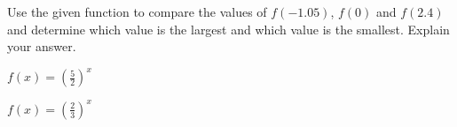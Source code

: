 \vfill

\begin{exercise}Use the given function to compare the values of $f(-1.05)$, $f(0)$ and $f(2.4)$ and determine which value is the largest and which value is the smallest. Explain your answer. \\
	\noindent
	\begin{enumerate*}[label={(\arabic*)~}]
		\item $f(x)=\left(\frac{5}{2}\right)^x$
		\item $f(x)=\left(\frac23\right)^x$
		\hfill\null
	\end{enumerate*}
\end{exercise}

\vfill
\begin{center} \hfill
\end{center}
